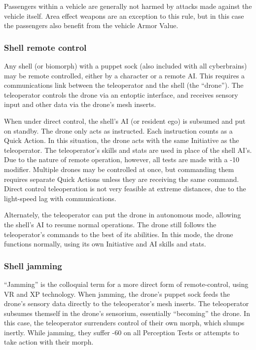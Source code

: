 Passengers within a vehicle are generally not harmed by attacks made against the vehicle itself. Area effect weapons are an exception to this rule, but in this case the passengers also benefit from the vehicle Armor Value. 

\subsubsection{Shell remote control} 

Any shell (or biomorph) with a puppet sock (also included with all cyberbrains) may be remote controlled, either by a character or a remote AI. This requires a communications link between the teleoperator and the shell (the ``drone”). The teleoperator controls the drone via an entoptic interface, and receives sensory input and other data via the drone’s mesh inserts. 

When under direct control, the shell’s AI (or resident ego) is subsumed and put on standby. The drone only acts as instructed. Each instruction counts as a Quick Action. In this situation, the drone acts with the same Initiative as the teleoperator. The teleoperator’s skills and stats are used in place of the shell AI’s. Due to the nature of remote operation, however, all tests are made with a -10 modifier. Multiple drones may be controlled at once, but commanding them requires separate Quick Actions unless they are receiving the same command. Direct control teleoperation is not very feasible at extreme distances, due to the light-speed lag with communications. 

Alternately, the teleoperator can put the drone in autonomous mode, allowing the shell’s AI to resume normal operations. The drone still follows the teleoperator’s commands to the best of its abilities. In this mode, the drone functions normally, using its own Initiative and AI skills and stats. 

\subsubsection{Shell jamming} 

``Jamming'' is the colloquial term for a more direct form of remote-control, using VR and XP technology. When jamming, the drone’s puppet sock feeds the drone’s sensory data directly to the teleoperator’s mesh inserts. The teleoperator subsumes themself in the drone’s sensorium, essentially ``becoming'' the drone. In this case, the teleoperator surrenders control of their own morph, which slumps inertly. While jamming, they suffer -60 on all Perception Tests or attempts to take action with their morph. 

